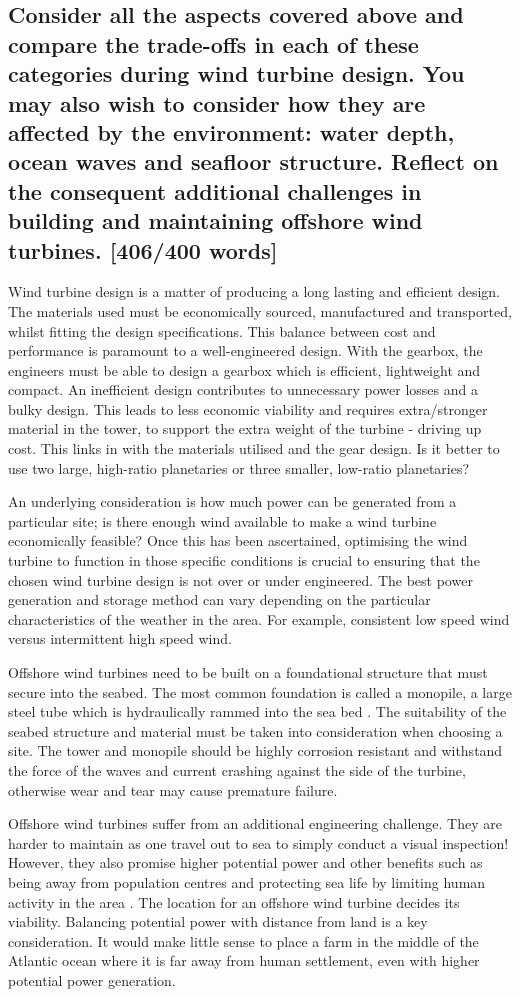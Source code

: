 \documentclass[12pt]{article}
\numberwithin{equation}{section}
\begin{document}
\begin{flushleft}
\subsection*{Consider all the aspects covered above and compare the trade-offs in each of these categories during wind turbine design. You may also wish to consider how they are affected by the environment: water depth, ocean waves and seafloor structure. Reflect on the consequent additional challenges in building and maintaining offshore wind turbines. [406/400 words]}
Wind turbine design is a matter of producing a long lasting and efficient design. The materials used must be economically sourced, manufactured and transported, whilst fitting the design specifications. This balance between cost and performance is paramount to a well-engineered design. With the gearbox, the engineers must be able to design a gearbox which is efficient, lightweight and compact. An inefficient design contributes to unnecessary power losses and a bulky design. This leads to less economic viability and requires extra/stronger material in the tower, to support the extra weight of the turbine - driving up cost. This links in with the materials utilised and the gear design. Is it better to use two large, high-ratio planetaries or three smaller, low-ratio planetaries? 

An underlying consideration is how much power can be generated from a particular site; is there enough wind available to make a wind turbine economically feasible? Once this has been ascertained, optimising the wind turbine to function in those specific conditions is crucial to ensuring that the chosen wind turbine design is not over or under engineered. The best power generation and storage method can vary depending on the particular characteristics of the weather in the area. For example, consistent low speed wind versus intermittent high speed wind. 

Offshore wind turbines need to be built on a foundational structure that must secure into the seabed. The most common foundation is called a monopile, a large steel tube which is hydraulically rammed into the sea bed \citep{monopile}. The suitability of the seabed structure and material must be taken into consideration when choosing a site. The tower and monopile should be highly corrosion resistant and withstand the force of the waves and current crashing against the side of the turbine, otherwise wear and tear may cause premature failure.

Offshore wind turbines suffer from an additional engineering challenge. They are harder to maintain as one travel out to sea to simply conduct a visual inspection! However, they also promise higher potential power and other benefits such as being away from population centres and protecting sea life by limiting human activity in the area \citep{offshorePower}. The location for an offshore wind turbine decides its viability. Balancing potential power with distance from land is a key consideration. It would make little sense to place a farm in the middle of the Atlantic ocean where it is far away from human settlement, even with higher potential power generation. 


\end{flushleft}
\end{document}
